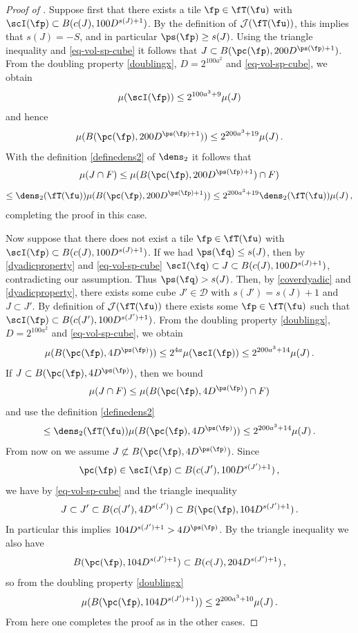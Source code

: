 \begin{proof}[Proof of ]
    Suppose first that there exists a tile $\fp \in \fT(\fu)$ with $\scI(\fp) \subset B(c(J), 100 D^{s(J) + 1})$. By the definition of $\mathcal{J}(\fT(\fu))$, this implies that $s(J) = -S$, and in particular $\ps(\fp) \ge s(J)$. Using the triangle inequality and \eqref{eq-vol-sp-cube} it follows that $J \subset B(\pc(\fp), 200 D^{\ps(\fp) + 1})$. From the doubling property \eqref{doublingx}, $D=2^{100a^2}$ and \eqref{eq-vol-sp-cube}, we obtain
    $$
        \mu(\scI(\fp)) \le 2^{100a^3 + 9} \mu(J)
    $$
    and hence
    $$
        \mu( B(\pc(\fp), 200 D^{\ps(\fp) + 1})) \le 2^{200a^3 +19} \mu(J)\,.
    $$
    With the definition \eqref{definedens2} of $\dens_2$ it follows that
    $$
        \mu(J \cap F) \le \mu( B(\pc(\fp), 200 D^{\ps(\fp) + 1}) \cap F)
    $$
    $$
        \le \dens_2(\fT(\fu)) \mu( B(\pc(\fp), 200 D^{\ps(\fp) + 1})) \le 2^{200a^3 +19} \dens_2(\fT(\fu))\mu(J)\,,
    $$
    completing the proof in this case.

    Now suppose that there does not exist a tile $\fp \in \fT(\fu)$ with $\scI(\fp) \subset B(c(J), 100 D^{s(J) + 1})$. If we had $\ps(\fq) \le s(J)$, then by \eqref{dyadicproperty} and \eqref{eq-vol-sp-cube} $\scI(\fq) \subset J \subset B(c(J), 100 D^{s(J) + 1})$, contradicting our assumption. Thus $\ps(\fq) > s(J)$. Then, by \eqref{coverdyadic} and \eqref{dyadicproperty}, there exists some cube $J' \in \mathcal{D}$ with $s(J') = s(J) + 1$ and $J \subset J'$. By definition of $\mathcal{J}(\fT(\fu))$ there exists some $\fp \in \fT(\fu)$ such that $\scI(\fp) \subset B(c(J'), 100 D^{s(J') + 1})$. From the doubling property \eqref{doublingx}, $D=2^{100a^2}$ and \eqref{eq-vol-sp-cube}, we obtain
    \begin{equation}
        \label{eq-measure-comparison-1}
        \mu(B(\pc(\fp), 4D^{\ps(\fp)})) \le 2^{4a} \mu(\scI(\fp)) \le 2^{200a^3 + 14} \mu(J)\,.
    \end{equation}
    If $J \subset B(\pc(\fp), 4 D^{\ps(\fp)})$, then we bound
    $$
        \mu(J \cap F) \le \mu(B(\pc(\fp), 4D^{\ps(\fp)}) \cap F)
    $$
    and use the definition \eqref{definedens2}
    $$
        \le \dens_2(\fT(\fu)) \mu(B(\pc(\fp), 4D^{\ps(\fp)})) \le 2^{200a^3 + 14} \mu(J)\,.
    $$
    From now on we assume $J \not \subset B(\pc(\fp), 4 D^{\ps(\fp)})$.
    Since
    \begin{equation*}
        \pc(\fp) \in \scI(\fp) \subset B(c(J'), 100 D^{s(J') + 1})\, ,
    \end{equation*}
    we have by \eqref{eq-vol-sp-cube} and the triangle inequality
    $$
        J \subset J' \subset B(c(J'), 4D^{s(J')}) \subset B(\pc(\fp), 104 D^{s(J') + 1})\,.
    $$
    In particular this implies $104 D^{s(J') + 1} > 4D^{\ps(\fp)}$. By the triangle inequality we also have
    $$
        B(\pc(\fp), 104 D^{s(J') + 1}) \subset B(c(J), 204 D^{s(J') + 1})\,,
    $$
    so from the doubling property \eqref{doublingx}
    $$
        \mu( B(\pc(\fp), 104 D^{s(J') + 1})) \le 2^{200a^3 + 10} \mu(J)\,.
    $$
    From here one completes the proof as in the other cases.
\end{proof}

